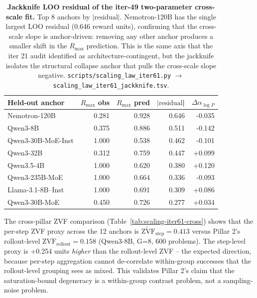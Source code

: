 \documentclass{article}
\providecommand{\tableref}[1]{Table~\ref{#1}}
\begin{document}
\begin{table}[t]
  \centering
  \small
  \begin{tabular}{lrrrr}
    \toprule
    Held-out anchor & \(R_{\max}\) obs & \(R_{\max}\) pred & \(|\mathrm{residual}\)| & \(\Delta\alpha_{\log P}\) \\
    \midrule
    Nemotron-120B & 0.281 & 0.928 & 0.646 & -0.035 \\
    Qwen3-8B & 0.375 & 0.886 & 0.511 & -0.142 \\
    Qwen3-30B-MoE-Inst & 1.000 & 0.538 & 0.462 & -0.101 \\
    Qwen3-32B & 0.312 & 0.759 & 0.447 & +0.099 \\
    Qwen3.5-4B & 1.000 & 0.620 & 0.380 & +0.120 \\
    Qwen3-235B-MoE & 1.000 & 0.664 & 0.336 & -0.093 \\
    Llama-3.1-8B--Inst & 1.000 & 0.691 & 0.309 & +0.086 \\
    Qwen3-30B-MoE & 0.450 & 0.726 & 0.277 & +0.034 \\
    \bottomrule
  \end{tabular}
  \caption{\textbf{Jackknife LOO residual of the iter-49 two-parameter
    cross-scale fit.}  Top 8 anchors by \(|\mathrm{residual}|\).
    Nemotron-120B has the single largest LOO residual
    (0.646 reward units),
    confirming that the cross-scale slope is anchor-driven: removing
    any other anchor produces a smaller shift in the
    \(R_{\max}\) prediction.  This is the same axis that the
    iter 21 audit identified as architecture-contingent, but the
    jackknife isolates the structural collapse anchor that pulls
    the cross-scale slope negative.  \texttt{scripts/scaling\_law\_iter61.py}
    \(\to\) \texttt{scaling\_law\_iter61\_jackknife.tsv}.}
  \label{tab:scaling-iter61-jack}
\end{table}

The cross-pillar ZVF comparison
(\tableref{tab:scaling-iter61-cross}) shows that the per-step
ZVF proxy across the 12 anchors is
\(\widetilde{\mathrm{ZVF}}_{\mathrm{step}} = 0.413\)
versus Pillar 2's rollout-level
\(\mathrm{ZVF}_{\mathrm{rollout}} = 0.158\)
(Qwen3-8B, G=8, 600 problems).  The step-level proxy is
+0.254 units
{\emph{higher}} than the rollout-level ZVF -- the expected
direction, because per-step aggregation cannot de-correlate
within-group successes that the rollout-level grouping sees as
mixed.  This validates Pillar 2's claim that the saturation-bound
degeneracy is a within-group contrast problem, not a sampling-noise
problem.
\end{document}
